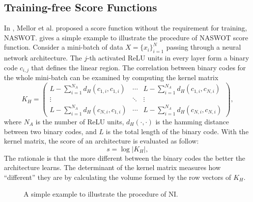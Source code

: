 \documentclass[sigconf]{acmart}
\begin{document}
    \subsection{Training-free Score Functions}
    In \cite{https://doi.org/10.48550/arxiv.2006.04647}, Mellor et al. 
    proposed a score function without the requirement for training, NASWOT. 
     gives a simple example 
    to illustrate the procedure of NASWOT score function. Consider a 
    mini-batch of data $X=\{x_i\}^N_{i=1}$ passing through a neural network 
    architecture. The $j$-th activated ReLU units in every layer  
    form a binary code $c_{i,j}$ that defines the linear region. The correlation 
    between binary codes for the whole mini-batch can be examined by computing 
    the kernel matrix 
    \begin{equation}
        K_H=\begin{pmatrix}L-\sum_{i=1}^{N_A}d_H(c_{1,i},c_{1,i})&\cdots&L-\sum_{i=1}^{N_A}d_H(c_{1,i},c_{N,i})\\\vdots&\ddots&\vdots\\L-\sum_{i=1}^{N_A}d_H(c_{N,i},c_{1,i})&\cdots&L-\sum_{i=1}^{N_A}d_H(c_{N,i},c_{N,i})\end{pmatrix},
    \end{equation}
    where $N_A$ is the number of ReLU units, $d_H(\cdot,\cdot)$ is the hamming 
    distance between two binary codes, and $L$ is the total length of the binary 
    code. With the kernel matrix, the score of an architecture is evaluated as 
    follow: 
    \begin{equation}
        s=\log\lvert K_H\rvert,
    \end{equation}
    The rationale is that the more different between the binary codes 
    the better the architecture learns. The determinant of the kernel matrix 
    measures how ``different'' they are by calculating the volume formed by the 
    row vectors of $K_H$. 

    \begin{figure*}[tb]
        \vspace{-\baselineskip}
        \caption{A simple example to illustrate the procedure of NI.}
        \label{fig:ni}
        \centering
        \vspace{-\baselineskip}
    \end{figure*}
\end{document}
